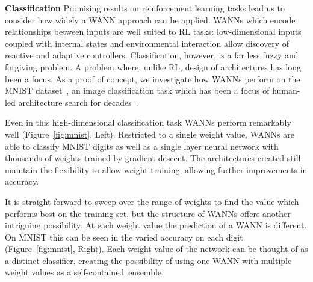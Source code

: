 \textbf{Classification}\:
%
Promising results on reinforcement learning tasks lead us to consider how widely a WANN approach can be applied. WANNs which encode relationships between inputs are well suited to RL tasks: low-dimensional inputs coupled with internal states and environmental interaction allow discovery of reactive and adaptive controllers. Classification, however, is a far less fuzzy and forgiving problem. A problem where, unlike RL, design of architectures has long been a focus. As a proof of concept, we investigate how WANNs perform on the MNIST dataset~\cite{lecun1998mnist}, an image classification task which has been a focus of human-led architecture search for decades~\cite{lecun1998gradient,chollet2015keras,sabour2017dynamic}.


Even in this high-dimensional classification task WANNs perform remarkably well (Figure~\ref{fig:mnist}, Left). Restricted to a single weight value, WANNs are able to classify MNIST digits as well as a single layer neural network with thousands of weights trained by gradient descent. The architectures created still maintain the flexibility to allow weight training, allowing further improvements in accuracy.


%

It is straight forward to sweep over the range of weights to find the value which performs best on the training set, but the structure of WANNs offers another intriguing possibility.
%
At each weight value the prediction of a WANN is different.
%
On MNIST this can be seen in the varied accuracy on each digit (Figure~\ref{fig:mnist}, Right).
%
Each weight value of the network can be thought of as a distinct classifier, creating the possibility of using one WANN with multiple weight values as a self-contained~ensemble. %

